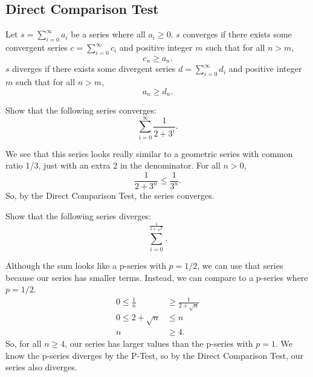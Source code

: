 \subsection{Direct Comparison Test}
\begin{lemma}
	Let $s = \sum_{i=0}^{\infty}{a_i}$ be a series where all $a_i \geq 0$.
	$s$ converges if there exists some convergent series $c = \sum_{i=0}^{\infty}{c_i}$ and positive integer $m$ such that for all $n > m$,
	\begin{equation*}
		c_n \geq a_n.
	\end{equation*}
	$s$ diverges if there exists some divergent series $d = \sum_{i=0}^{\infty}{d_i}$ and positive integer $m$ such that for all $n > m$,
	\begin{equation*}
		a_n \geq d_n.
	\end{equation*}
\end{lemma}

\begin{example}
	Show that the following series converges:
	\begin{equation*}
		\sum_{i=0}^{\infty}{\frac{1}{2 + 3^i}}.
	\end{equation*}
\end{example}
We see that this series looks really similar to a geometric series with common ratio 1/3, just with an extra 2 in the denominator.
For all $n > 0$,
\begin{equation*}
	\frac{1}{2+3^n} \leq \frac{1}{3^n}.
\end{equation*}
\indent
So, by the Direct Comparison Test, the series converges.

\begin{example}
	Show that the following series diverges:
	\begin{equation*}
		\sum_{i=0}^{\frac{1}{2+\sqrt{i}}}.
	\end{equation*}
\end{example}
Although the sum looks like a p-series with $p=1/2$, we can use that series because our series has smaller terms.
Instead, we can compare to a p-series where $p=1/2$.
\begin{align*}
	0 \leq \frac{1}{n} &\geq \frac{1}{2+\sqrt{n}} \\
	0 \leq 2 + \sqrt{n} &\leq n \\
	n & \geq 4.
\end{align*}
\indent
So, for all $n \geq 4$, our series has larger values than the p-series with $p=1$.
We know the p-series diverges by the P-Test, so by the Direct Comparison Test, our series also diverges.


